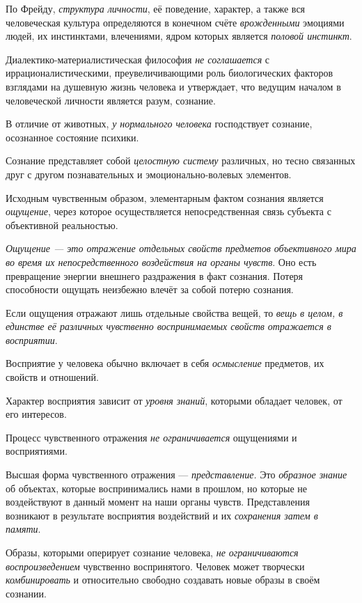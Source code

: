 \documentclass[a4paper,14pt,russian]{extreport}
\begin{document}
По Фрейду, \emph{структура личности}, её поведение, характер, а также вся человеческая культура определяются в конечном счёте \emph{врожденными} эмоциями людей, их инстинктами, влечениями, ядром которых является \emph{половой инстинкт}.

Диалектико-материалистическая философия \emph{не соглашается} с иррационалистическими, преувеличивающими роль биологических факторов взглядами на душевную жизнь человека и утверждает, что ведущим началом в человеческой личности является разум, сознание.

В отличие от животных, \emph{у нормального человека} господствует сознание, осознанное состояние психики.

Сознание представляет собой \emph{целостную систему} различных, но тесно связанных друг с другом познавательных и эмоционально-волевых элементов.

Исходным чувственным образом, элементарным фактом сознания является \emph{ощущение}, через которое осуществляется непосредственная связь субъекта с объективной реальностью.

\emph{Ощущение --- это отражение отдельных свойств предметов объективного мира во время их непосредственного воздействия на органы чувств}. Оно есть превращение энергии внешнего раздражения в факт сознания. Потеря способности ощущать неизбежно влечёт за собой потерю сознания.

Если ощущения отражают лишь отдельные свойства вещей, то \emph{вещь в целом, в единстве её различных чувственно воспринимаемых свойств отражается в восприятии}.

Восприятие у человека обычно включает в себя \emph{осмысление} предметов, их свойств и отношений.

Характер восприятия зависит от \emph{уровня знаний}, которыми обладает человек, от его интересов.

Процесс чувственного отражения \emph{не ограничивается} ощущениями и восприятиями.

Высшая форма чувственного отражения --- \emph{представление.} Это \emph{образное знание} об объектах, которые воспринимались нами в прошлом, но которые не воздействуют в данный момент на наши органы чувств. Представления возникают в результате восприятия воздействий и их \emph{сохранения затем в памяти}.

Образы, которыми оперирует сознание человека, \emph{не ограничиваются воспроизведением} чувственно воспринятого. Человек может творчески \emph{комбинировать} и относительно свободно создавать новые образы в своём сознании.
\end{document}
